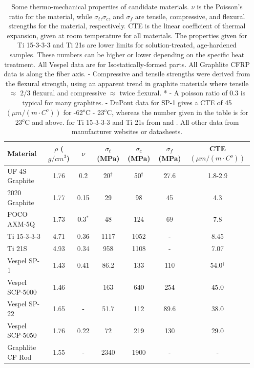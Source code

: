 \documentclass{report}
\begin{document}
\begin{table}[htb]%
\begin{threeparttable}
\begin{tabular}{lcccccc}
\toprule
\textbf{Material} & $\rho$ ($g/cm^3$) & $\nu$ & $\sigma_{t}$ (MPa) & $\sigma_{c}$ (MPa)
& $\sigma_{f}$ (MPa) & CTE $(\mu m/(m\cdot C^o))$ \\
\midrule
 UF-4S Graphite & 1.76  & 0.2 & 20$^{\dag}$ & 50$^{\dag}$ & 27.6 & 1.8-2.9 \\
 2020 Graphite & 1.77 & 0.15 & 29 & 98 & 45 & 4.3 \\
 POCO AXM-5Q & 1.73 & 0.3$^{*}$ & 48 & 124 & 69 & 7.8 \\
 Ti 15-3-3-3 & 4.71 & 0.36 & 1117 & 1052 & - & 8.45 \\
 Ti 21S & 4.93 & 0.34 & 958 & 1108 & - & 7.07 \\
 Vespel SP-1 & 1.43 & 0.41 & 86.2 & 133 & 110 & 54.0$^{\ddag}$ \\
 Vespel SCP-5000 & 1.46 & - & 163 & 640 & 254 & 45.0 \\
 Vespel SP-22 & 1.65 & - & 51.7 & 112 & 89.6 & 38.0 \\
 Vespel SCP-5050 & 1.76 & 0.22 & 72 & 219 & 130 & 29.0 \\
 Graphlite CF Rod & 1.55 & -  & 2340 & 1900 & - & - \\
 \bottomrule
\end{tabular}
\caption{Some thermo-mechanical properties of candidate materials. $\nu$ is the Poisson's ratio for the material, while $\sigma_{t}$,$\sigma_{c}$, and $\sigma_{f}$ are tensile, compressive, and flexural strengths for the material, respectively. CTE is the linear coefficient of thermal expansion, given at room temperature for all materials. The properties given for Ti 15-3-3-3 and Ti 21s are lower limits for solution-treated, age-hardened samples. These numbers can be higher or lower depending on the specific heat treatment. All Vespel data are for Isostatically-formed parts. All Graphlite CFRP data is along the fiber axis. \dag - Compressive and tensile strengths were derived from the flexural strength, using an apparent trend in graphite materials where tensile $\approx$ 2/3 flexural and compressive $\approx$ twice flexural. * - A poisson ratio of 0.3 is typical for many graphites. \ddag - DuPont data for SP-1 gives a CTE of 45 $(\mu m/(m\cdot C^o))$ for -62$^{o}$C - 23$^{o}$C, whereas the number given in the table is for 23$^{o}$C and above. for Ti 15-3-3-3 and Ti 21s from \cite{Nyakana2005} and \cite{Johnson1996}. All other data from manufacturer websites or datasheets.}
\end{threeparttable}
\end{table}
\end{document}
